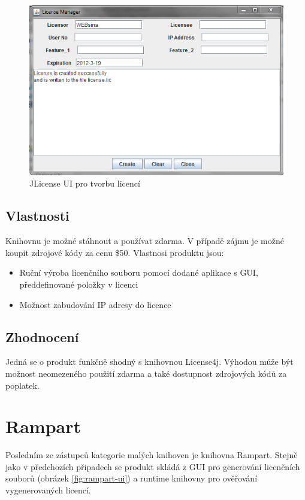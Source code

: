 \begin{figure}[TB]
\begin{center}
\includegraphics[width=12cm]{figures/jlicense.PNG}
\caption{JLicense UI pro tvorbu licencí}
\label{fig:jlicense-ui} 
\end{center}
\end{figure}

\subsection*{Vlastnosti}
Knihovnu je možné stáhnout a používat zdarma. V případě zájmu je možné koupit
zdrojové kódy za cenu \$50. Vlastnosi produktu jsou:

\begin{itemize}
  \item Ruční výroba licenčního souboru pomocí dodané aplikace s \gls{GUI},
  předdefinované položky v licenci
  \item Možnost zabudování IP adresy do licence
\end{itemize}

\subsection*{Zhodnocení}
Jedná se o produkt funkčně shodný s knihovnou License4j. Výhodou může být
možnost neomezeného použití zdarma a také dostupnost zdrojových kódů za
poplatek.


\section{Rampart}
Posledním ze zástupců kategorie malých knihoven je knihovna
Rampart\cite{rampart}. Stejně jako v předchozích připadech se produkt skládá z
\gls{GUI} pro generování licenčních souborů (obrázek \ref{fig:rampart-ui}) a runtime
knihovny pro ověřování vygenerovaných licencí.

